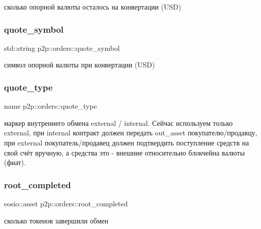 сколько опорной валюты осталось на конвертации (U\+SD) \mbox{\label{structp2p_1_1orders_ade50869ce026a09b486aff7dcd157d39}} 
\subsubsection{\texorpdfstring{quote\+\_\+symbol}{quote\_symbol}}
{\footnotesize\ttfamily std\+::string p2p\+::orders\+::quote\+\_\+symbol}

символ опорной валюты при конвертации (U\+SD) \mbox{\label{structp2p_1_1orders_ae2d706bd60dd6808b5d8d06cb584ca26}} 
\subsubsection{\texorpdfstring{quote\+\_\+type}{quote\_type}}
{\footnotesize\ttfamily name p2p\+::orders\+::quote\+\_\+type}

маркер внутреннего обмена external / internal. Сейчас используем только external, при internal контракт должен передать out\+\_\+asset покупателю/продавцу, при external покупатель/продавец должен подтвердить поступление средств на свой счёт вручную, а средства это -\/ внешние относительно блокчейна валюты (фиат). \mbox{\label{structp2p_1_1orders_aff1ea77bef5d251952e8d5e1f1dcfbc1}} 
\subsubsection{\texorpdfstring{root\+\_\+completed}{root\_completed}}
{\footnotesize\ttfamily eosio\+::asset p2p\+::orders\+::root\+\_\+completed}

сколько токенов завершили обмен \mbox{\label{structp2p_1_1orders_af0f8a3e55db6c2a7642eb25fdb4a4f50}} 
